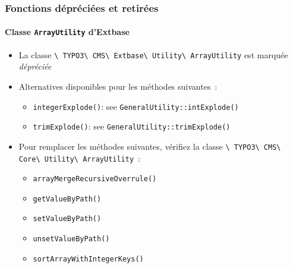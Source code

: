 \begin{frame}[fragile]
	\frametitle{Fonctions dépréciées et retirées}
	\framesubtitle{Classe \texttt{ArrayUtility} d'Extbase}

	\begin{itemize}
		\item La classe
			\texttt{\textbackslash
				TYPO3\textbackslash
				CMS\textbackslash
				Extbase\textbackslash
				Utility\textbackslash
				ArrayUtility} est marquée \textit{dépréciée}

		\item Alternatives disponibles pour les méthodes suivantes~:

			\begin{itemize}
				\item \texttt{integerExplode()}: see \texttt{GeneralUtility::intExplode()}
				\item \texttt{trimExplode()}: see \texttt{GeneralUtility::trimExplode()}
			\end{itemize}

		\item Pour remplacer les méthodes suivantes, vérifiez la classe
			\texttt{\textbackslash
				TYPO3\textbackslash
				CMS\textbackslash
				Core\textbackslash
				Utility\textbackslash
				ArrayUtility}~:

			\begin{itemize}
				\item \texttt{arrayMergeRecursiveOverrule()}
				\item \texttt{getValueByPath()}
				\item \texttt{setValueByPath()}
				\item \texttt{unsetValueByPath()}
				\item \texttt{sortArrayWithIntegerKeys()}
			\end{itemize}

	\end{itemize}

\end{frame}




